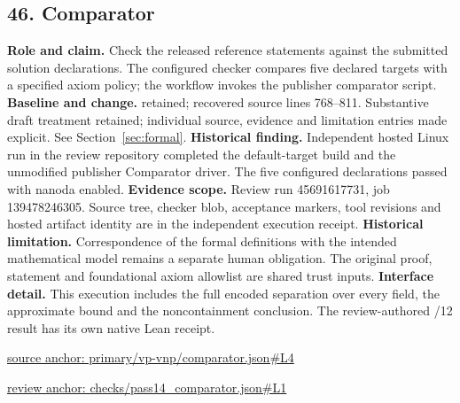 \documentclass[11pt,letterpaper]{article}
\theoremstyle{definition}\newtheorem{definition}[theorem]{Definition}\newtheorem{example}[theorem]{Example}
\theoremstyle{remark}\newtheorem{remark}[theorem]{Remark}
\begin{document}
\subsection*{46. Comparator}
\textbf{Role and claim.} Check the released reference statements against the submitted solution declarations. The configured checker compares five declared targets with a specified axiom policy; the workflow invokes the publisher comparator script.
\textbf{Baseline and change.} retained; recovered source lines 768--811. Substantive draft treatment retained; individual source, evidence and limitation entries made explicit. See Section~\ref{sec:formal}.
\textbf{Historical finding.} Independent hosted Linux run in the review repository completed the default-target build and the unmodified publisher Comparator driver. The five configured declarations passed with nanoda enabled.
\textbf{Evidence scope.} Review run 45691617731, job 139478246305. Source tree, checker blob, acceptance markers, tool revisions and hosted artifact identity are in the independent execution receipt.
\textbf{Historical limitation.} Correspondence of the formal definitions with the intended mathematical model remains a separate human obligation. The original proof, statement and foundational axiom allowlist are shared trust inputs.
\textbf{Interface detail.} This execution includes the full encoded separation over every field, the approximate bound and the noncontainment conclusion. The review-authored /12 result has its own native Lean receipt.
\par\href{https://github.com/nousentllc/VP-VNP-Review/blob/8a7976933b6b2b4ffda1ad3a0dfb5fc6b6f023e8/primary/vp-vnp/comparator.json\#L4}{source anchor: primary/vp-vnp/comparator.json\#L4}
\par\href{https://github.com/nousentllc/VP-VNP-Review/blob/8a7976933b6b2b4ffda1ad3a0dfb5fc6b6f023e8/checks/pass14_comparator.json\#L1}{review anchor: checks/pass14\_comparator.json\#L1}
\goodbreak
\end{document}
